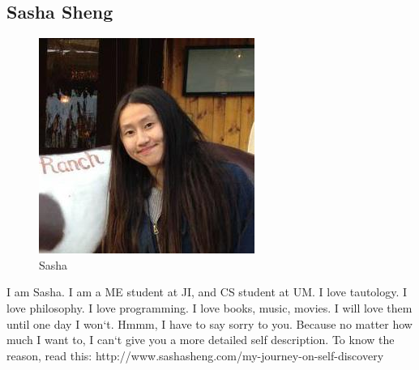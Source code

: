 \documentclass[paper=letter, fontsize=11pt]{scrartcl}
\numberwithin{equation}{section}		%
\numberwithin{figure}{section}			%
\numberwithin{table}{section}			%
\begin{document}
\subsection{Sasha Sheng}
\begin{figure}[H]
	\centering
	\includegraphics[scale=1]{Profile}
	\caption{Sasha}
\end{figure}
I am Sasha. I am a ME student at JI, and CS student at UM. I love tautology. I love philosophy. I love programming. I love books, music, movies. I will love them until one day I won`t. Hmmm, I have to say sorry to you. Because no matter how much I want to, I can`t give you a more detailed self description. To know the reason, read this: http://www.sashasheng.com/my-journey-on-self-discovery
\pagebreak
\end{document}
